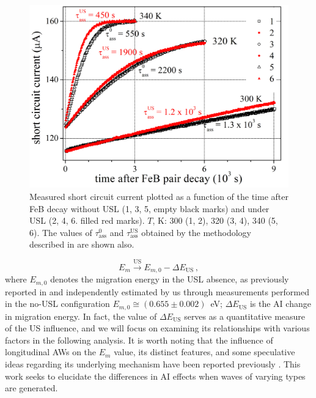 \documentclass{ttp}
\begin{document}

\begin{figure}
	\centering
     \includegraphics[width=\linewidth]{Fig1.png}
	  \caption{Measured short circuit current plotted as a function of the time after FeB decay
      without USL (1, 3, 5, empty black marks) and under USL (2, 4, 6. filled red marks).
      $T$, K: 300 (1, 2), 320 (3, 4), 340 (5, 6).
      The values of $\tau_\mathrm{ass}^0$ and $\tau_\mathrm{ass}^\mathrm{US}$ obtained
      by the methodology described in \cite{Olikh2021JAP,Olikh2022:JMatSci} are shown also.
}\label{fig1}
\end{figure}

\begin{equation}
\label{eqEmUs}
E_m \xrightarrow{\mathrm{US}} E_{m,0}-\Delta E_\mathrm{US}\,,
\end{equation}
where
$E_{m,0}$ denotes the migration energy in the USL absence,
as previously reported in \cite{FeBAssJAP2014}
and independently estimated by us through measurements performed in the no-USL configuration
$E_{m,0}\cong(0.655\pm0.002)$~eV;
$\Delta E_\mathrm{US}$ is the AI change in migration energy.
In fact, the value of $\Delta E_\mathrm{US}$ serves as a quantitative measure
of the US influence, and we will focus on examining its relationships with various factors in the following analysis.
It is worth noting that the influence of longitudinal AWs on the $E_m$ value,
its distinct features, and some speculative ideas regarding its underlying mechanism have been reported previously \cite{Olikh2021JAP,Olikh2022:JMatSci}.
This work seeks to elucidate the differences in AI effects when waves of varying types are generated.
\end{document}

